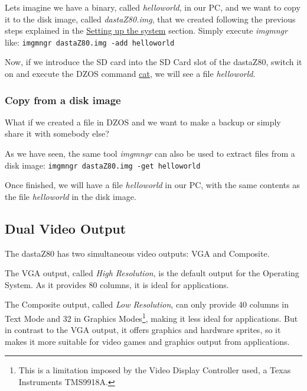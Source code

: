         Lets imagine we have a binary, called \textit{helloworld}, in our PC, and we
        want to copy it to the disk image, called \textit{dastaZ80.img}, that we
        created following the previous steps explained in the
        \hyperref[sec:setting_system]{Setting up the system} section. Simply execute
        \textit{imgmngr} like: \texttt{imgmngr dastaZ80.img -add helloworld}

        Now, if we introduce the SD card into the SD Card slot of the dastaZ80,
        switch it on and execute the DZOS command \hyperref[cmd:cat]{cat}, we will
        see a file \textit{helloworld}.

        \subsubsection{Copy from a disk image}

        What if we created a file in DZOS and we want to make a backup or simply
        share it with somebody else?

        As we have seen, the same tool \textit{imgmngr} can also be used to extract
        files from a disk image: \texttt{imgmngr dastaZ80.img -get helloworld}

        Once finished, we will have a file \textit{helloworld} in our PC, with the
        same contents as the file \textit{helloworld} in the disk image.

    \subsection{Dual Video Output}

    The dastaZ80 has two simultaneous video outputs: VGA and Composite.

    The VGA output, called \textit{High Resolution}, is the default output for
    the Operating System. As it provides 80 columns, it is ideal for
    applications.

    The Composite output, called \textit{Low Resolution}, can only provide 40
    columns in Text Mode and 32 in Graphics Modes\footnote{This is a limitation
    imposed by the Video Display Controller used, a Texas Instruments TMS9918A.},
    making it less ideal for applications. But in contrast to the VGA output, it
    offers graphics and hardware sprites, so it makes it more suitable for video
    games and graphics output from applications.

